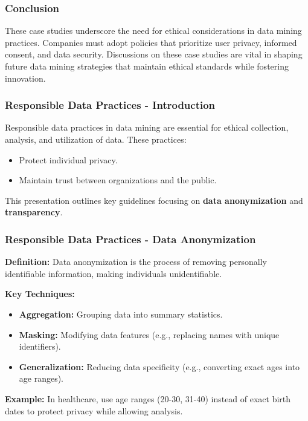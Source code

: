 \documentclass{beamer}
\begin{document}
\begin{frame}[fragile]
    \frametitle{Conclusion}
    These case studies underscore the need for ethical considerations in data mining practices. 
    Companies must adopt policies that prioritize user privacy, informed consent, and data security. 
    Discussions on these case studies are vital in shaping future data mining strategies that maintain ethical standards while fostering innovation.
\end{frame}

\begin{frame}[fragile]
    \frametitle{Responsible Data Practices - Introduction}
    Responsible data practices in data mining are essential for ethical collection, analysis, and utilization of data. These practices:
    \begin{itemize}
        \item Protect individual privacy.
        \item Maintain trust between organizations and the public.
    \end{itemize}
    This presentation outlines key guidelines focusing on \textbf{data anonymization} and \textbf{transparency}.
\end{frame}

\begin{frame}[fragile]
    \frametitle{Responsible Data Practices - Data Anonymization}
    \textbf{Definition:} Data anonymization is the process of removing personally identifiable information, making individuals unidentifiable.

    \textbf{Key Techniques:}
    \begin{itemize}
        \item \textbf{Aggregation:} Grouping data into summary statistics.
        \item \textbf{Masking:} Modifying data features (e.g., replacing names with unique identifiers).
        \item \textbf{Generalization:} Reducing data specificity (e.g., converting exact ages into age ranges).
    \end{itemize}
    
    \textbf{Example:} In healthcare, use age ranges (20-30, 31-40) instead of exact birth dates to protect privacy while allowing analysis.
\end{frame}
\end{document}

